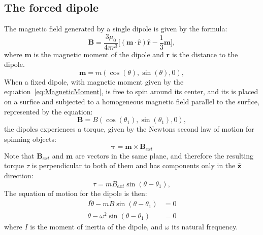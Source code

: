 \subsection{The forced dipole}
The magnetic field generated by a single dipole is given by the formula: 
\begin{equation}
    \boldsymbol{B} = \dfrac{3\mu_0}{4 \pi r^3}\bigg[ (\boldsymbol{m \cdot \hat{r}})\boldsymbol{\hat{r}} - \dfrac{1}{3}\boldsymbol{m} \bigg],
    \label{eq:MagneticFieldDipole}
\end{equation}
where $\boldsymbol{m}$ is the magnetic moment of the dipole and $\boldsymbol{r}$ is the distance to the dipole. 
\begin{equation}
    \boldsymbol{m} = m (\cos (\theta),\sin (\theta),0),
    \label{eq:MagneticMoment}
\end{equation}
When a fixed dipole, with magnetic moment given by the equation~\ref{eq:MagneticMoment}, is free to spin around it\textquotesingle s center, and it\textquotesingle s is placed on a surfice and subjected to a homogeneous magnetic field parallel to the surfice, represented by the equation:
\begin{equation}
    \boldsymbol{B} = B (\cos (\theta_1),\sin (\theta_1),0),
\end{equation}
the dipoles experiences a torque, given by the Newton\textquotesingle s second law of motion for spinning objects: 
\begin{equation}
    \boldsymbol{\tau} = \boldsymbol{m} \times \boldsymbol{B}_{ext}
    \label{eq:NewtonSecondLaw}
\end{equation}
Note that $\boldsymbol{B}_{ext}$ and $\boldsymbol{m}$ are vectors in the same plane, and therefore the resulting torque $\tau$ is perpendicular to both of them and has components only in the $\boldsymbol{\hat{z}}$ direction: 
\begin{equation}
        \tau = mB_{ext} \sin(\theta - \theta_1)
        \label{eq:SingleDipoleEquation},
\end{equation}
The equation of motion for the dipole is then:
\begin{equation}
    \begin{aligned}
        I\ddot{\theta} - m B \sin(\theta - \theta_1) &=0\\
        \ddot{\theta} -\omega^2\sin(\theta - \theta_1) &=0
    \end{aligned}
    \label{eq:DipoleDiffEquation}
\end{equation}
where $I$ is the moment of inertia of the dipole, and $\omega$ its natural frequency.
